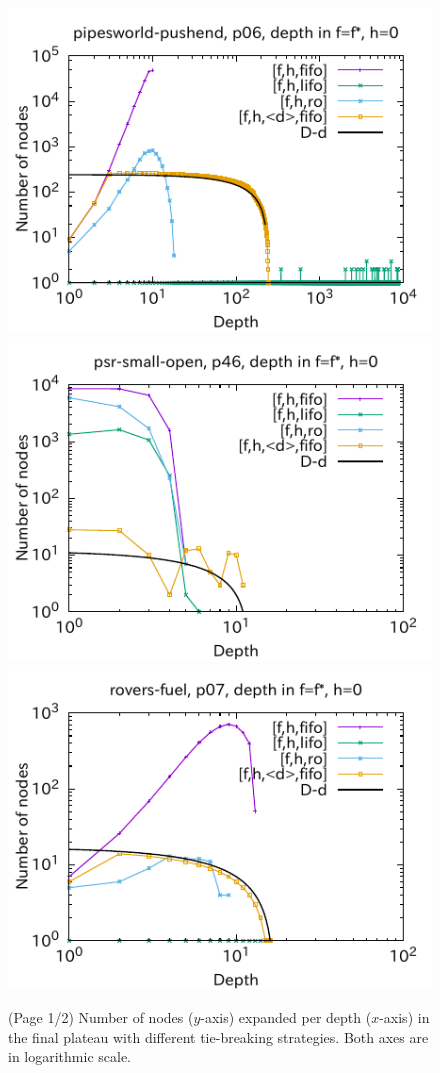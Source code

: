 \begin{figure}[htbp]
\includegraphics{img/output-lmcut/pipesworld-pushend/p06-0.pdf}
\includegraphics{img/output-lmcut/psr-small-open/p46-0.pdf}
\includegraphics{img/output-lmcut/rovers-fuel/p07-0.pdf}
 \caption{(Page 1/2) Number of nodes ($y$-axis) expanded per depth ($x$-axis) in
 the final plateau with different tie-breaking strategies. Both axes are in logarithmic scale.
 }
 \label{fig:depth-histogram2}
\end{figure}

